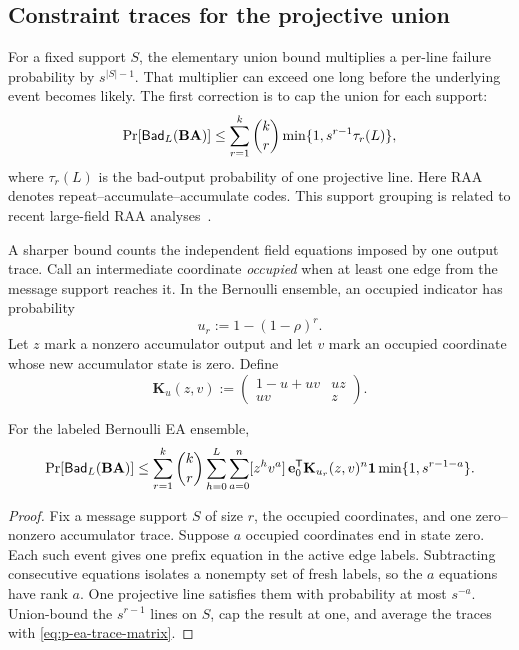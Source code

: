 \subsection{Constraint traces for the projective union}

For a fixed support $S$, the elementary union bound multiplies a per-line
failure probability by $s^{|S|-1}$.  That multiplier can exceed one long
before the underlying event becomes likely.  The first correction is to cap
the union for each support:
\begin{equation}
 \Pr[\mathsf{Bad}_L(\mathbf B\mathbf A)]
 \leq\sum_{r=1}^{k}\binom{k}{r}
 \min\{1,s^{r-1}\tau_r(L)\},
 \label{eq:support-grouping}
\end{equation}
where $\tau_r(L)$ is the bad-output probability of one projective line.
Here RAA denotes repeat--accumulate--accumulate codes.  This support grouping
is related to recent large-field RAA
analyses~\cite{AkhianiZhang2026,Khabbazian2026}.

A sharper bound counts the independent field equations imposed by one output
trace.  Call an intermediate coordinate \emph{occupied} when at least one
edge from the message support reaches it.  In the Bernoulli ensemble, an
occupied indicator has probability
\begin{equation}
 u_r:=1-(1-\rho)^r.
\end{equation}
Let $z$ mark a nonzero accumulator output and let $v$ mark an occupied
coordinate whose new accumulator state is zero.  Define
\begin{equation}
 \mathbf K_u(z,v):=
 \begin{pmatrix}1-u+uv&uz\\uv&z\end{pmatrix}.
 \label{eq:p-ea-trace-matrix}
\end{equation}

\begin{theorem}
\label{thm:p-ea-trace}
For the labeled Bernoulli EA ensemble,
\begin{equation}
 \Pr[\mathsf{Bad}_L(\mathbf B\mathbf A)]\leq
 \sum_{r=1}^{k}\binom{k}{r}
 \sum_{h=0}^{L}\sum_{a=0}^{n}
 [z^hv^a]\,
 \mathbf e_0^{\mathsf T}\mathbf K_{u_r}(z,v)^n\mathbf 1
 \min\{1,s^{r-1-a}\}.
 \label{eq:p-ea-trace-bound}
\end{equation}
\end{theorem}

\begin{proof}
Fix a message support $S$ of size $r$, the occupied coordinates, and one
zero--nonzero accumulator trace.  Suppose $a$ occupied coordinates end in
state zero.  Each such event gives one prefix equation in the active edge
labels.  Subtracting consecutive equations isolates a nonempty set of fresh
labels, so the $a$ equations have rank $a$.  One projective line satisfies
them with probability at most $s^{-a}$.  Union-bound the $s^{r-1}$ lines on
$S$, cap the result at one, and average the traces with
\eqref{eq:p-ea-trace-matrix}.
\end{proof}

